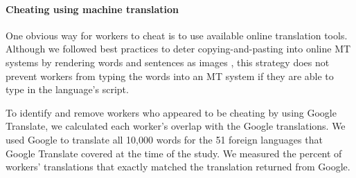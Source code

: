 \documentclass[11pt]{article}
\begin{document}
\paragraph{Cheating using machine translation}


One obvious way for workers to cheat is to use available online translation tools. Although we followed best practices to deter copying-and-pasting into online MT systems  by  rendering words and sentences as images \cite{zaidan-callisonburch:2011:ACL-HLT2011a}, this strategy does not prevent workers from typing the words into an MT system if they are able to type in the language's script. 

To identify and remove workers who appeared to be cheating by using Google Translate, we calculated each worker's overlap with the Google translations. We used Google to translate all 10,000 words for the 51 foreign languages that Google Translate covered at the time of the study. We measured the percent of workers' translations that exactly matched the translation returned from Google. 


\end{document}
